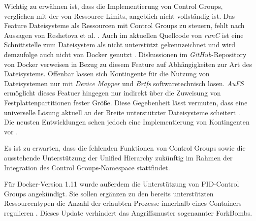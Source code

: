 \documentclass[../main.tex]{subfiles}
\begin{document}
		Wichtig zu erwähnen ist, dass die Implementierung von Control Groups, verglichen mit der von Ressource Limits, angeblich nicht vollständig ist. Das Feature Dateisysteme als Ressourcen mit Control Groups zu steuern, fehlt nach Aussagen von Reshetova et al. \cite[S.19]{dockerSec2}. Auch im aktuellen Quellcode von \emph{runC} ist eine Schnittstelle zum Dateisystem als \glqq{}nicht unterstützt\grqq{} gekennzeichnet und wird demzufolge auch nicht von Docker genutzt \cite{githubRunCCgroups}. Diskussionen im \emph{GitHub}-Repository von Docker verweisen in Bezug zu diesem Feature auf Abhängigkeiten zur Art des Dateisystems. Offenbar lassen sich Kontingente für die Nutzung von Dateisystemen nur mit \emph{Device Mapper} und \emph{Brtfs} softwaretechnisch lösen. \emph{AuFS} ermöglicht dieses Featuer hingegen nur indirekt über die Zuweisung von Festplattenpartitionen fester Größe. Diese Gegebenheit lässt vermuten, dass eine universelle Lösung aktuell an der Breite unterstützter Dateisysteme scheitert \cite{githubDockerIssueFsQuota}. Die neusten Entwicklungen sehen jedoch eine Implementierung von Kontingenten vor \cite{githubDockerPullBrtfs}.

		Es ist zu erwarten, dass die fehlenden Funktionen von Control Groups sowie die ausstehende Unterstützung der Unified Hierarchy zukünftig im Rahmen der Integration des Control Groups-Namespace stattfindet.

		Für Docker-Version 1.11 wurde außerdem die Unterstützung von PID-Control Groups angekündigt. Sie sollen ergänzen zu den bereits unterstützten Ressourcentypen die Anzahl der erlaubten Prozesse innerhalb eines Containers regulieren \cite{githubCgroupPID}\cite{docker110Security}. Dieses Update verhindert das Angriffsmuster sogenannter \glspl{ForkBomb}.


\end{document}
